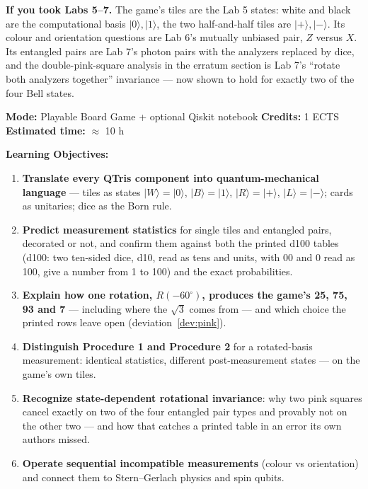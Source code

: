 \documentclass[a4paper,11pt]{article}
\providecommand{\ket}[1]{|#1\rangle}
\begin{document}
\begin{connectionbox}
\textbf{If you took Labs 5--7.} The game's tiles are the Lab 5 states: white and black
are the computational basis $\ket{0}, \ket{1}$, the two half-and-half tiles are
$\ket{+}, \ket{-}$. Its colour and orientation questions are Lab 6's mutually unbiased
pair, $Z$ versus $X$. Its entangled pairs are Lab 7's photon pairs with the analyzers
replaced by dice, and the double-pink-square analysis in the erratum section is Lab 7's
``rotate both analyzers together'' invariance --- now shown to hold for exactly two of the
four Bell states.
\end{connectionbox}

\noindent\textbf{Mode:} Playable Board Game + optional Qiskit notebook \quad\textbf{Credits:} 1 ECTS
\quad\textbf{Estimated time:} $\approx$ 10 h

\vspace{0.3cm}
\noindent\textbf{Learning Objectives:}
\begin{enumerate}
    \item \textbf{Translate every QTris component into quantum-mechanical language} ---
          tiles as states $\ket{W} = \ket{0}$, $\ket{B} = \ket{1}$, $\ket{R} = \ket{+}$,
          $\ket{L} = \ket{-}$; cards as unitaries; dice as the Born rule.
    \item \textbf{Predict measurement statistics} for single tiles and entangled pairs,
          decorated or not, and confirm them against both the printed d100 tables (d100:
          two ten-sided dice, d10, read as tens and units, with 00 and 0 read as 100, give a
          number from 1 to 100) and the exact probabilities.
    \item \textbf{Explain how one rotation, $R(-60^\circ)$, produces the game's 25, 75, 93 and 7}
          --- including where the $\sqrt{3}$ comes from --- and which choice the printed rows leave
          open (deviation~\ref{dev:pink}).
    \item \textbf{Distinguish Procedure 1 and Procedure 2} for a rotated-basis
          measurement: identical statistics, different post-measurement states --- on
          the game's own tiles.
    \item \textbf{Recognize state-dependent rotational invariance}: why two pink squares
          cancel exactly on two of the four entangled pair types and provably not on the
          other two --- and how that catches a printed table in an error its own authors
          missed.
    \item \textbf{Operate sequential incompatible measurements} (colour vs orientation)
          and connect them to Stern--Gerlach physics and spin qubits.
\end{enumerate}
\end{document}
